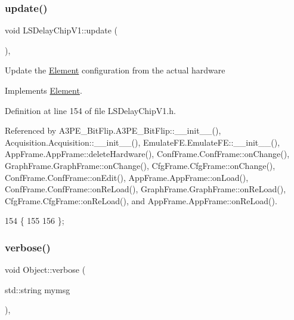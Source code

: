 \subsubsection{\texorpdfstring{update()}{update()}}
{\footnotesize\ttfamily void L\+S\+Delay\+Chip\+V1\+::update (\begin{DoxyParamCaption}{ }\end{DoxyParamCaption})\hspace{0.3cm}{\ttfamily [inline]}, {\ttfamily [virtual]}}

Update the \hyperlink{classElement}{Element} configuration from the actual hardware 

Implements \hyperlink{classElement_a4e6c83efae95616ebddd03c793a26661}{Element}.



Definition at line 154 of file L\+S\+Delay\+Chip\+V1.\+h.



Referenced by A3\+P\+E\+\_\+\+Bit\+Flip.\+A3\+P\+E\+\_\+\+Bit\+Flip\+::\+\_\+\+\_\+init\+\_\+\+\_\+(), Acquisition.\+Acquisition\+::\+\_\+\+\_\+init\+\_\+\+\_\+(), Emulate\+F\+E.\+Emulate\+F\+E\+::\+\_\+\+\_\+init\+\_\+\+\_\+(), App\+Frame.\+App\+Frame\+::delete\+Hardware(), Conf\+Frame.\+Conf\+Frame\+::on\+Change(), Graph\+Frame.\+Graph\+Frame\+::on\+Change(), Cfg\+Frame.\+Cfg\+Frame\+::on\+Change(), Conf\+Frame.\+Conf\+Frame\+::on\+Edit(), App\+Frame.\+App\+Frame\+::on\+Load(), Conf\+Frame.\+Conf\+Frame\+::on\+Re\+Load(), Graph\+Frame.\+Graph\+Frame\+::on\+Re\+Load(), Cfg\+Frame.\+Cfg\+Frame\+::on\+Re\+Load(), and App\+Frame.\+App\+Frame\+::on\+Re\+Load().


\begin{DoxyCode}
154                  \{
155     
156   \};
\end{DoxyCode}
\mbox{\label{classObject_a83d2db2df682907ea1115ad721c1c4a1}} 
\subsubsection{\texorpdfstring{verbose()}{verbose()}\hspace{0.1cm}{\footnotesize\ttfamily [1/2]}}
{\footnotesize\ttfamily void Object\+::verbose (\begin{DoxyParamCaption}\item[{std\+::string}]{mymsg }\end{DoxyParamCaption})\hspace{0.3cm}{\ttfamily [inline]}, {\ttfamily [inherited]}}



